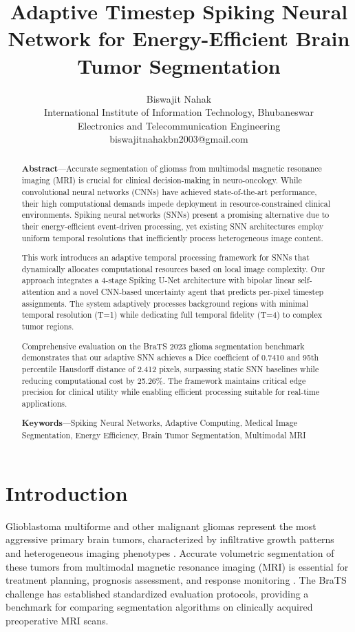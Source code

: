 \documentclass[12pt,a4paper]{article}
\title{\textbf{Adaptive Timestep Spiking Neural Network for Energy-Efficient Brain Tumor Segmentation}}
\author{Biswajit Nahak \\
International Institute of Information Technology, Bhubaneswar \\
Electronics and Telecommunication Engineering \\
biswajitnahakbn2003@gmail.com}
\begin{document}
\maketitle

\tableofcontents
\newpage

\begin{abstract}
\noindent \textbf{Abstract}---Accurate segmentation of gliomas from multimodal magnetic resonance imaging (MRI) is crucial for clinical decision-making in neuro-oncology. While convolutional neural networks (CNNs) have achieved state-of-the-art performance, their high computational demands impede deployment in resource-constrained clinical environments. Spiking neural networks (SNNs) present a promising alternative due to their energy-efficient event-driven processing, yet existing SNN architectures employ uniform temporal resolutions that inefficiently process heterogeneous image content.

This work introduces an adaptive temporal processing framework for SNNs that dynamically allocates computational resources based on local image complexity. Our approach integrates a 4-stage Spiking U-Net architecture with bipolar linear self-attention and a novel CNN-based uncertainty agent that predicts per-pixel timestep assignments. The system adaptively processes background regions with minimal temporal resolution (T=1) while dedicating full temporal fidelity (T=4) to complex tumor regions.

Comprehensive evaluation on the BraTS 2023 glioma segmentation benchmark demonstrates that our adaptive SNN achieves a Dice coefficient of 0.7410 and 95th percentile Hausdorff distance of 2.412 pixels, surpassing static SNN baselines while reducing computational cost by 25.26\%. The framework maintains critical edge precision for clinical utility while enabling efficient processing suitable for real-time applications.

\textbf{Keywords}---Spiking Neural Networks, Adaptive Computing, Medical Image Segmentation, Energy Efficiency, Brain Tumor Segmentation, Multimodal MRI
\end{abstract}

\section{Introduction}
\label{sec:introduction}

Glioblastoma multiforme and other malignant gliomas represent the most aggressive primary brain tumors, characterized by infiltrative growth patterns and heterogeneous imaging phenotypes \cite{menze2015multimodal}. Accurate volumetric segmentation of these tumors from multimodal magnetic resonance imaging (MRI) is essential for treatment planning, prognosis assessment, and response monitoring \cite{bakas2017advancing}. The BraTS challenge has established standardized evaluation protocols, providing a benchmark for comparing segmentation algorithms on clinically acquired preoperative MRI scans.
\end{document}
